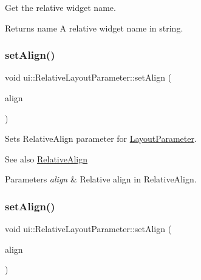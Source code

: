 Get the relative widget name. \begin{DoxyReturn}{Returns}
name A relative widget name in string. 
\end{DoxyReturn}
\mbox{\label{classui_1_1RelativeLayoutParameter_a5eadca3a1cac5c1b87d493945281696a}} 
\subsubsection{\texorpdfstring{set\+Align()}{setAlign()}\hspace{0.1cm}{\footnotesize\ttfamily [1/2]}}
{\footnotesize\ttfamily void ui\+::\+Relative\+Layout\+Parameter\+::set\+Align (\begin{DoxyParamCaption}\item[{\hyperlink{classui_1_1RelativeLayoutParameter_a40283d09524c58e61741de3288e6769d}{Relative\+Align}}]{align }\end{DoxyParamCaption})}

Sets Relative\+Align parameter for \hyperlink{classui_1_1LayoutParameter}{Layout\+Parameter}.

\begin{DoxySeeAlso}{See also}
\hyperlink{classui_1_1RelativeLayoutParameter_a40283d09524c58e61741de3288e6769d}{Relative\+Align} 
\end{DoxySeeAlso}

\begin{DoxyParams}{Parameters}
{\em align} & Relative align in {\ttfamily Relative\+Align}. \\
\hline
\end{DoxyParams}
\mbox{\label{classui_1_1RelativeLayoutParameter_a5eadca3a1cac5c1b87d493945281696a}} 
\subsubsection{\texorpdfstring{set\+Align()}{setAlign()}\hspace{0.1cm}{\footnotesize\ttfamily [2/2]}}
{\footnotesize\ttfamily void ui\+::\+Relative\+Layout\+Parameter\+::set\+Align (\begin{DoxyParamCaption}\item[{\hyperlink{classui_1_1RelativeLayoutParameter_a40283d09524c58e61741de3288e6769d}{Relative\+Align}}]{align }\end{DoxyParamCaption})}

